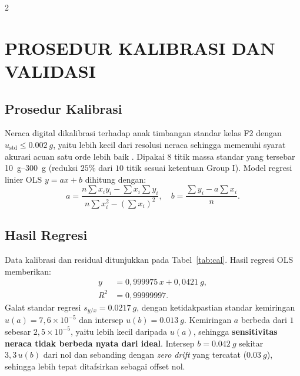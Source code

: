 \documentclass[a4paper, 12pt]{article}
\begin{document}
\begin{multicols}{2}
    \raggedcolumns
    \section{PROSEDUR KALIBRASI DAN VALIDASI}
        \subsection{Prosedur Kalibrasi}
        Neraca digital dikalibrasi terhadap anak timbangan standar kelas F2 dengan $u_{\mathrm{std}}\le\SI{0,002}{g}$, yaitu lebih kecil dari resolusi neraca sehingga memenuhi syarat akurasi acuan satu orde lebih baik \parencite{WinarnoYhuwana}. Dipakai $8$ titik massa standar yang tersebar \SIrange{10}{300}{g} (reduksi $25\%$ dari $10$ titik sesuai ketentuan Group I). Model regresi linier OLS $y=ax+b$ dihitung dengan:
        \begin{equation}
            a=\frac{n\sum x_iy_i-\sum x_i\sum y_i}{n\sum x_i^{2}-\left(\sum x_i\right)^{2}},\quad
            b=\frac{\sum y_i-a\sum x_i}{n}.
            \label{eq:ols}
        \end{equation}

        \subsection{Hasil Regresi}
        Data kalibrasi dan residual ditunjukkan pada Tabel~\ref{tab:cal}. Hasil regresi OLS memberikan:
        \begin{equation}
            \boxed{
                \begin{aligned}
                    y &= 0{,}999975\,x+0{,}0421\ \si{g},\\
                    R^{2} &= 0{,}99999997.
                \end{aligned}
            }
        \end{equation}
        Galat standar regresi $s_{y/x}=\SI{0,0217}{g}$, dengan ketidakpastian standar kemiringan $u(a)=7{,}6\times10^{-5}$ dan intersep $u(b)=\SI{0,013}{g}$. Kemiringan $a$ berbeda dari $1$ sebesar $2{,}5\times10^{-5}$, yaitu lebih kecil daripada $u(a)$, sehingga \textbf{sensitivitas neraca tidak berbeda nyata dari ideal}. Intersep $b=\SI{0,042}{g}$ sekitar $3{,}3\,u(b)$ dari nol dan sebanding dengan \textit{zero drift} yang tercatat ($\SI{0,03}{g}$), sehingga lebih tepat ditafsirkan sebagai offset nol.
\end{multicols}
\end{document}
